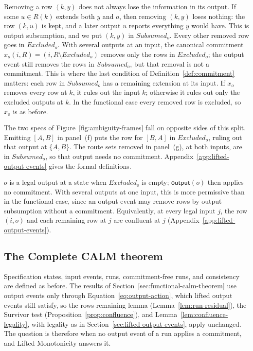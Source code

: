 \documentclass[sigconf]{cidr-2027}
\theoremstyle{remark}
\newcommand{\commitment}{commitment\xspace}
\newcommand{\outrel}{extends\xspace}          %
\newcommand{\Subsumed}{\mathit{Subsumed}}
\newcommand{\Excluded}{\mathit{Excluded}}
\begin{document}
\textcolor{reviewed}{Removing a row $(k,y)$ does not always lose the information in its output.} \textcolor{reviewed}{If some $u\in R(k)$ \outrel both $y$ and $o$, then removing $(k,y)$ loses nothing: the row $(k,u)$ is kept, and a later output $u$ reports everything $y$
would have.} This is output subsumption, and we put $(k,y)$ in $\Subsumed_o$. Every other removed row goes in $\Excluded_o$. With several outputs at an
input, the canonical \commitment $x_o(i,R)=(i,R\setminus\Excluded_o)$ removes
only the rows in $\Excluded_o$; the output event still removes the rows in
$\Subsumed_o$, but that removal is not a \commitment. This is where the last
condition of Definition~\ref{def:commitment} matters: each row in
$\Subsumed_o$ has a remaining extension at its input. \textcolor{reviewed}{If $x_o$ removes
every row at $k$, it rules out the input $k$; otherwise it rules out only the
excluded outputs at $k$.} In the functional case every removed row is excluded,
so $x_o$ is as before.

\textcolor{reviewed}{The two specs of Figure~\ref{fig:ambiguity-frames} fall on opposite sides of this split.} \textcolor{reviewed}{Emitting $[A,B]$ in panel~(f) puts the row for $[B,A]$ in $\Excluded_o$, ruling out that output at $\{A,B\}$.} \textcolor{reviewed}{The route sets removed in panel~(g), at both inputs, are in $\Subsumed_o$, so that output needs no \commitment.} Appendix~\ref{app:lifted-output-events} gives the formal definitions.

$o$ is a legal output at a state when $\Excluded_o$ is empty;
$\mathsf{output}(o)$ then applies no \commitment. With several
outputs at one input, this is more permissive than in the functional case,
since an output event may remove rows by output subsumption without a
\commitment. Equivalently, at every legal input $j$, the row $(i,o)$ and each remaining row at $j$ are confluent at $j$ (Appendix~\ref{app:lifted-output-events}).

\subsection{The Complete CALM theorem}
\label{sec:complete-calm-theorem}

Specification states, input events, runs, \commitment-free runs, and
consistency are defined as before. The results of Section~\ref{sec:functional-calm-theorem}
use output events only through Equation~\ref{eq:output-action}, which lifted
output events still satisfy, so the rows-remaining lemma
(Lemma~\ref{lem:run-residual}), the Survivor test
(Proposition~\ref{prop:confluence}), and
Lemma~\ref{lem:confluence-legality}, with legality as in
Section~\ref{sec:lifted-output-events}, apply unchanged. The question is
therefore when no output event of a run applies a \commitment, and Lifted
Monotonicity answers it.
\end{document}
